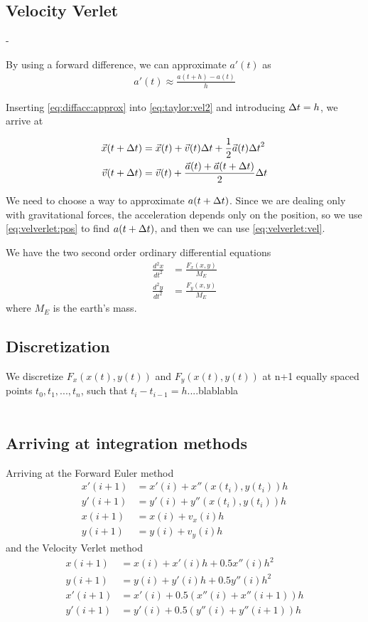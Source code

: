 \documentclass[a4paper]{article}
\begin{document}
\subsection{Velocity Verlet}-

By using a forward difference, we can approximate $a'(t)$ as
\begin{align}
    a'(t) \approx \frac{a(t+h) - a(t)}{h} \label{eq:diffacc:approx}
\end{align}

Inserting \eqref{eq:diffacc:approx} into \eqref{eq:taylor:vel2} and introducing ${\Delta t} = h$, we arrive at

\begin{align}
\vec{x}(t + {\Delta t}) &= \vec{x}(t) + \vec{v}(t){\Delta t} + \frac{1}{2} \vec{a}(t) {\Delta t}^2 \label{eq:velverlet:pos} \\
\vec{v}(t + {\Delta t}) &= \vec{v}(t) + \frac{\vec{a}(t) + \vec{a}(t + {\Delta t})}{2} {\Delta t} \label{eq:velverlet:vel}
\end{align}

We need to choose a way to approximate $a(t + {\Delta t})$. Since we are dealing only with gravitational forces, the acceleration depends only on the position, so we use \eqref{eq:velverlet:pos} to find $a(t + {\Delta t})$, and then we can use \eqref{eq:velverlet:vel}.



We have the two second order ordinary differential equations
\begin{align}
\frac{d^2x}{dt^2} &= \frac{F_x(x,y)}{M_E} \\
\frac{d^2y}{dt^2} &= \frac{F_y(x,y)}{M_E}
\end{align}
where $M_E$ is the earth's mass.\\

\subsection{Discretization}
We discretize $F_x(x(t),y(t))$ and $F_y(x(t),y(t))$ at n+1 equally spaced points $t_0, t_1,..., t_n$, such that $t_i - t_{i-1} = h$....blablabla\\
\\
\subsection{Arriving at integration methods}
Arriving at the Forward Euler method
\begin{align}
x'(i+1) &= x'(i) + x''(x(t_i), y(t_i))h\\
y'(i+1) &= y'(i) + y''(x(t_i), y(t_i))h\\
x(i+1) &= x(i) + v_x(i)h\\
y(i+1) &= y(i) + v_y(i)h
\end{align}
and the Velocity Verlet method
\begin{align}
x(i+1) &= x(i) + x'(i)h + 0.5x''(i)h^2\\
y(i+1) &= y(i) + y'(i)h + 0.5y''(i)h^2\\
x'(i+1) &= x'(i) + 0.5(x''(i) + x''(i+1))h\\
y'(i+1) &= y'(i) + 0.5(y''(i) + y''(i+1))h
\end{align}
\end{document}
